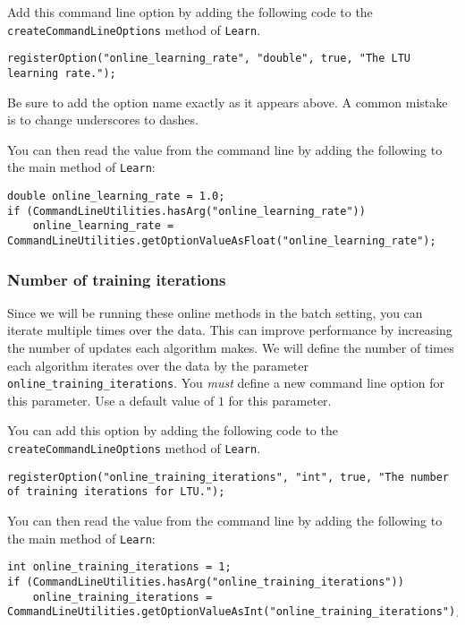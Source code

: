 \documentclass[11pt]{article}
\newcommand{\code}[1]{{\footnotesize \tt #1}}
\begin{document}
Add this command line option by adding the following code to the \code{createCommandLineOptions} method of \code{Learn}.
\begin{footnotesize}
\begin{verbatim}
registerOption("online_learning_rate", "double", true, "The LTU learning rate.");
\end{verbatim}
\end{footnotesize}

Be sure to add the option name exactly as it appears above. A common mistake is to change underscores to dashes.

You can then read the value from the command line by adding the following to the main method of \code{Learn}:
\begin{footnotesize}
\begin{verbatim}
double online_learning_rate = 1.0;
if (CommandLineUtilities.hasArg("online_learning_rate"))
    online_learning_rate = CommandLineUtilities.getOptionValueAsFloat("online_learning_rate");
\end{verbatim}
\end{footnotesize}

\subsubsection{Number of training iterations}
Since we will be running these online methods in the batch setting, you can iterate multiple times over the data. This can improve performance by increasing the number of updates each algorithm makes. We will define the number of times each algorithm iterates over the data by the parameter \code{online\_training\_iterations}. You \emph{must} define a new command line option for this parameter. Use a default value of $1$ for this parameter.

You can add this option by adding the following code to the \code{createCommandLineOptions} method of \code{Learn}.
\begin{footnotesize}
\begin{verbatim}
registerOption("online_training_iterations", "int", true, "The number of training iterations for LTU.");
\end{verbatim}
\end{footnotesize}


You can then read the value from the command line by adding the following to the main method of \code{Learn}:
\begin{footnotesize}
\begin{verbatim}
int online_training_iterations = 1;
if (CommandLineUtilities.hasArg("online_training_iterations"))
    online_training_iterations = CommandLineUtilities.getOptionValueAsInt("online_training_iterations");
\end{verbatim}
\end{footnotesize}
\end{document}
